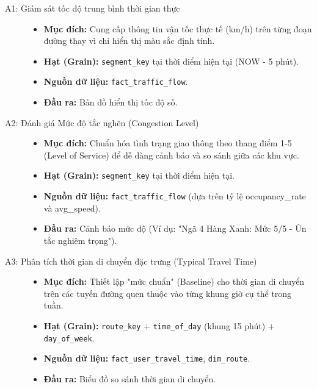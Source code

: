 \begin{description}
    \item[A1: Giám sát tốc độ trung bình thời gian thực]\hfill
    \begin{itemize}
        \item \textbf{Mục đích:} Cung cấp thông tin vận tốc thực tế (km/h) trên từng đoạn đường thay vì chỉ hiển thị màu sắc định tính.
        \item \textbf{Hạt (Grain):} \texttt{segment\_key} tại thời điểm hiện tại (NOW - 5 phút).
        \item \textbf{Nguồn dữ liệu:} \texttt{fact\_traffic\_flow}.
        \item \textbf{Đầu ra:} Bản đồ hiển thị tốc độ số.
    \end{itemize}

    \item[A2: Đánh giá Mức độ tắc nghẽn (Congestion Level)]\hfill

    \begin{itemize}
        \item \textbf{Mục đích:} Chuẩn hóa tình trạng giao thông theo thang điểm 1-5 (Level of Service) để dễ dàng cảnh báo và so sánh giữa các khu vực.
        \item \textbf{Hạt (Grain):} \texttt{segment\_key} tại thời điểm hiện tại.
        \item \textbf{Nguồn dữ liệu:} \texttt{fact\_traffic\_flow} (dựa trên tỷ lệ occupancy\_rate và avg\_speed).
        \item \textbf{Đầu ra:} Cảnh báo mức độ (Ví dụ: "Ngã 4 Hàng Xanh: Mức 5/5 - Ùn tắc nghiêm trọng").
    \end{itemize}

    \item[A3: Phân tích thời gian di chuyển đặc trưng (Typical Travel Time)]\hfill
    \begin{itemize}
        \item \textbf{Mục đích:} Thiết lập "mức chuẩn" (Baseline) cho thời gian di chuyển trên các tuyến đường quen thuộc vào từng khung giờ cụ thể trong tuần.
        \item \textbf{Hạt (Grain):} \texttt{route\_key} + \texttt{time\_of\_day} (khung 15 phút) + \texttt{day\_of\_week}.
        \item \textbf{Nguồn dữ liệu:} \texttt{fact\_user\_travel\_time}, \texttt{dim\_route}.
        \item \textbf{Đầu ra:} Biểu đồ so sánh thời gian di chuyển.
    \end{itemize}


\end{description}
